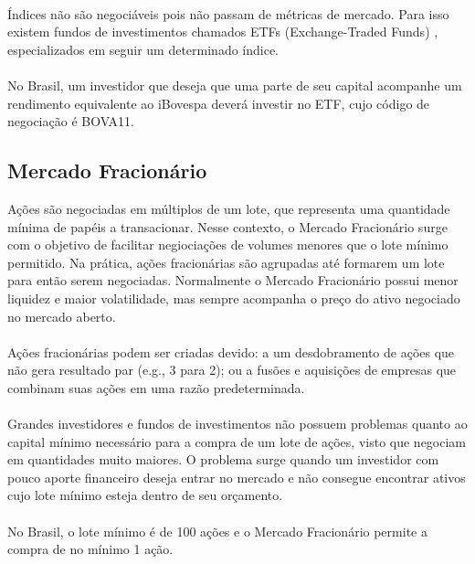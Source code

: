 \paragraph{} Índices não são negociáveis pois não passam de métricas de mercado. Para isso existem fundos de investimentos chamados ETFs (Exchange-Traded Funds) \cite{etf}, especializados em seguir um determinado índice.

\paragraph{} No Brasil, um investidor que deseja que uma parte de seu capital acompanhe um rendimento equivalente ao iBovespa deverá investir no ETF, cujo código de negociação é BOVA11.

\subsection{Mercado Fracionário}

Ações são negociadas em múltiplos de um lote, que representa uma quantidade mínima de papéis a transacionar. Nesse contexto, o Mercado Fracionário \cite{mercado_fracionario} surge com o objetivo de facilitar negiociações de volumes menores que o lote mínimo permitido. Na prática, ações fracionárias são agrupadas até formarem um lote para então serem negociadas. Normalmente o Mercado Fracionário possui menor liquidez e maior volatilidade, mas sempre acompanha o preço do ativo negociado no mercado aberto.

\paragraph{} Ações fracionárias podem ser criadas devido: a um desdobramento de ações que não gera resultado par (e.g., 3 para 2); ou a fusões e aquisições de empresas que combinam suas ações em uma razão predeterminada.

\paragraph{} Grandes investidores e fundos de investimentos não possuem problemas quanto ao capital mínimo necessário para a compra de um lote de ações, visto que negociam em quantidades muito maiores. O problema surge quando um investidor com pouco aporte financeiro deseja entrar no mercado e não consegue encontrar ativos cujo lote mínimo esteja dentro de seu orçamento.

\paragraph{} No Brasil, o lote mínimo é de 100 ações e o Mercado Fracionário permite a compra de no mínimo 1 ação.

